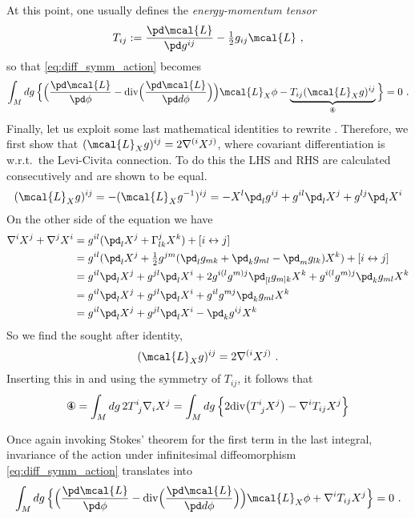 \documentclass[11pt]{article}
\begin{document}
At this point, one usually defines the \emph{energy-momentum 
	tensor}
\begin{equation}
	T_{ij} :=  \frac{\pd \mcal{L}}{\pd g^{ij}} - 
	\tfrac{1}{2}g_{ij}\mcal{L} ~,
\end{equation}
so that \eqref{eq:diff_symm_action} becomes
%
\begin{displaymath}
	\int_M dg\, \Big\{\Big( \frac{\pd \mcal{L}}{\pd \phi} 
		-\mathrm{div}\Big(\frac{\pd\mcal{L}}{\pd d\phi}\Big)\Big) 
		\mcal{L}_X\phi - \underbrace{T_{ij}(\mcal{L}_X 
			g)^{ij}}_\text{\ding{175}} \Big\} = 0~.
\end{displaymath}
%
Finally, let us exploit some last mathematical identities to 
rewrite . Therefore, we first show that 
$(\mcal{L}_Xg)^{ij} = 2\nabla^{(i}X^{j)}$, where covariant 
differentiation is w.r.t.~the Levi-Civita connection. To do this 
the LHS and RHS are calculated consecutively and are shown to be 
equal.
%
\begin{displaymath}
	(\mcal{L}_Xg)^{ij} = -(\mcal{L}_X g^{-1})^{ij}
	= -X^l\pd_l g^{ij} + g^{il}\pd_l X^j + g^{lj}\pd_l X^i
\end{displaymath}
On the other side of the equation we have
%
\begin{align*}
	\nabla^iX^j + \nabla^jX^i &= g^{il}(\pd_l X^j + 
	\Gamma^j_{lk}X^k) + [i \leftrightarrow j] \\
	&= g^{il}(\pd_l X^j + \tfrac{1}{2}g^{jm}(\pd_lg_{mk} + 
	\pd_kg_{ml} - \pd_mg_{lk})X^k) + [i \leftrightarrow j] \\
	&= g^{il}\pd_lX^j + g^{jl}\pd_lX^i + 
	2g^{i(l}g^{m)j}\pd_{[l}g_{m]k}X^k + 
	g^{i(l}g^{m)j}\pd_kg_{ml}X^k \\
	&= g^{il}\pd_lX^j + g^{jl}\pd_lX^i + 
	g^{il}g^{mj}\pd_kg_{ml}X^k \\
	&= g^{il}\pd_lX^j + g^{jl}\pd_lX^i - \pd_kg^{ij}X^k
\end{align*}
So we find the sought after identity,
%
\begin{equation}
	(\mcal{L}_Xg)^{ij} = 2 \nabla^{(i}X^{j)}~.
\end{equation}
Inserting this in  and using the symmetry of $T_{ij}$, 
it follows that
%
\begin{displaymath}
	\text{\ding{175}} = \int_M dg\, 2T^i_{~j}\nabla_i X^j = \int_M 
	dg\, \Big\{ 2 \mathrm{div}\big(T^i_{~j} X^j \big) - 
		\nabla^iT_{ij}X^j \Big\}
\end{displaymath}

Once again invoking Stokes' theorem for the first term in the 
last integral, invariance of the action under infinitesimal 
diffeomorphism \eqref{eq:diff_symm_action} translates into
%
\begin{equation}
	\int_M dg\, \Big\{ \Big( \frac{\pd \mcal{L}}{\pd \phi} 
		-\mathrm{div}\Big(\frac{\pd\mcal{L}}{\pd d\phi}\Big)\Big) 
		\mcal{L}_X\phi + \nabla^iT_{ij} X^j \Big\} = 0~.
\end{equation}
\end{document}
